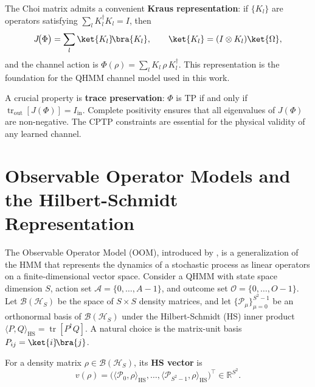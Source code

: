 The Choi matrix admits a convenient \textbf{Kraus representation}: if
$\{K_l\}$ are operators satisfying $\sum_l K_l^\dagger K_l = I$, then
\begin{equation}
J\!\bigl(\Phi\bigr) = \sum_l \ket{K_l}\!\bra{K_l},
\qquad
\ket{K_l} = (I \otimes K_l) \ket{\Omega},
\end{equation}
and the channel action is $\Phi(\rho) = \sum_l K_l \, \rho \, K_l^\dagger$.
This representation is the foundation for the QHMM channel model used in
this work.

A crucial property is \textbf{trace preservation}: $\Phi$ is TP if and
only if $\operatorname{tr}_{\mathrm{out}}[J(\Phi)] = I_{\mathrm{in}}$.
Complete positivity ensures that all eigenvalues of $J(\Phi)$ are
non-negative. The CPTP constraints are essential for the physical
validity of any learned channel.



\section{Observable Operator Models and the Hilbert-Schmidt Representation}
\label{sec:hmm_oom}

The Observable Operator Model (OOM), introduced by
\citet{jaeger2000oom}, is a generalization of the HMM that represents
the dynamics of a stochastic process as linear operators on a
finite-dimensional vector space. Consider a QHMM with state space
dimension $S$, action set $\mathcal{A} = \{0, \ldots, A-1\}$, and
outcome set $\mathcal{O} = \{0, \ldots, O-1\}$. Let $\mathcal{B}(\mathcal{H}_S)$
be the space of $S \times S$ density matrices, and let
$\{\mathcal{P}_\mu\}_{\mu=0}^{S^2-1}$ be an orthonormal basis of
$\mathcal{B}(\mathcal{H}_S)$ under the Hilbert-Schmidt (HS) inner product
$\langle P, Q \rangle_{\mathrm{HS}} = \operatorname{tr}[P^\dagger Q]$.
A natural choice is the matrix-unit basis
$P_{ij} = \ket{i}\!\bra{j}$.

\begin{definition}[HS Vector]
For a density matrix $\rho \in \mathcal{B}(\mathcal{H}_S)$, its
\textbf{HS vector} is
\begin{equation}
v(\rho) = \bigl( \langle \mathcal{P}_0, \rho \rangle_{\mathrm{HS}},
               \ldots,
               \langle \mathcal{P}_{S^2-1}, \rho \rangle_{\mathrm{HS}} \bigr)^\top
\in \mathbb{R}^{S^2}.
\end{equation}
\end{definition}

